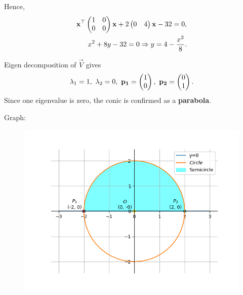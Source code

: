\documentclass{beamer}
\begin{document}
Hence,
\begin{align}
\mathbf{x}^\top\begin{pmatrix}1 & 0 \\ 0 & 0\end{pmatrix}\mathbf{x} + 2\begin{pmatrix}0 & 4\end{pmatrix}\mathbf{x} - 32 = 0,\\
x^2 + 8y - 32 = 0 \Rightarrow y =4- \frac{x^2}{8}.
\end{align}

Eigen decomposition of $\vec{V}$ gives
\begin{align}
\lambda_1 = 1, \ \lambda_2 = 0, \ 
\vec{p_1} = \myvec{1 \\ 0}, \ 
\vec{p_2} = \myvec{0 \\ 1}.
\end{align}
Since one eigenvalue is zero, the conic is confirmed as a \textbf{parabola}.\newline

Graph:
\begin{figure}[H]
    \centering
    \includegraphics[scale=0.5]{plot}
    \caption{}
    \label{fig:plot}
\end{figure}
\end{document}
